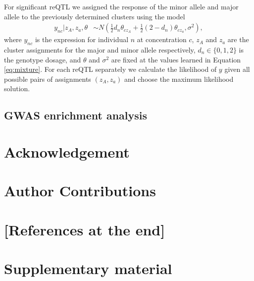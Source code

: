 \documentclass{article}
\begin{document}
{For significant reQTL we assigned the response of the minor allele and major allele to the previously determined clusters using the model
\begin{align*}
y_{nc} | z_A,z_a, \theta &\sim N\left( \frac12 d_n \theta_{cz_A} + \frac12 (2 - d_n) \theta_{cz_a}, \sigma^2 \right),
\end{align*}
where $y_{nc}$ is the expression for individual $n$ at concentration $c$, $z_A$ and $z_a$ are the cluster assignments for the major and minor allele respectively, $d_n \in \{0,1,2\}$ is the genotype dosage, and $\theta$ and $\sigma^2$ are fixed at the values learned in Equation \ref{eq:mixture}. For each reQTL separately we calculate the likelihood of $y$ given all possible pairs of assignments $(z_A,z_a)$ and choose the maximum likelihood solution. 

\subsection*{GWAS enrichment analysis}
 
\section*{Acknowledgement}


\section*{Author Contributions}

\section*{[References at the end]}
\newpage

%
%     

\setcounter{figure}{0}
\makeatletter 
\renewcommand{\thefigure}{S\@arabic\c@figure}

\section{Supplementary material} 

}
\end{document}
